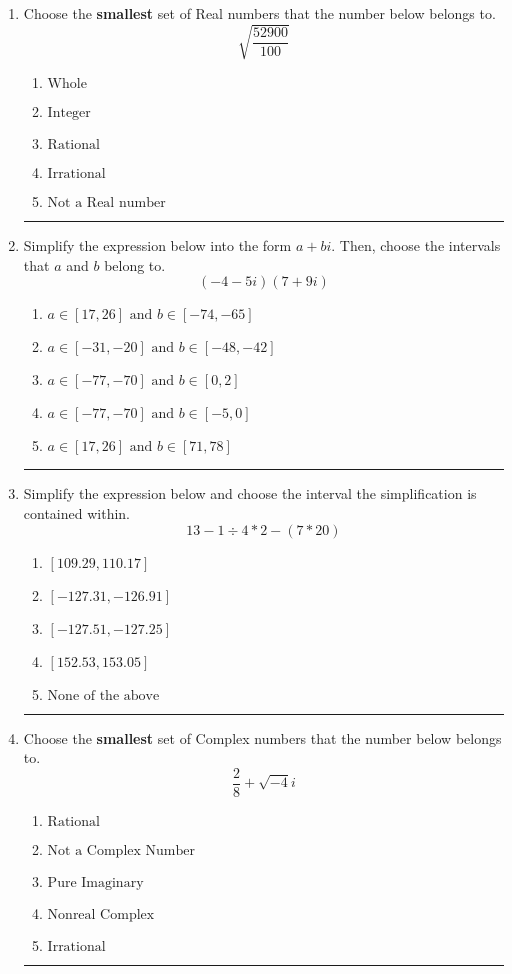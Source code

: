 \documentclass[14pt]{extbook}
\newcommand{\litem}[1]{\item#1\hspace*{-1cm}\rule{\textwidth}{0.4pt}}
\begin{document}
\begin{enumerate}
{\begin{enumerate}[label=\Alph*.]
\end{enumerate} }
\litem{
Choose the \textbf{smallest} set of Real numbers that the number below belongs to.\[ \sqrt{\frac{52900}{100}} \]\begin{enumerate}[label=\Alph*.]
\item \( \text{Whole} \)
\item \( \text{Integer} \)
\item \( \text{Rational} \)
\item \( \text{Irrational} \)
\item \( \text{Not a Real number} \)

\end{enumerate} }
\litem{
Simplify the expression below into the form $a+bi$. Then, choose the intervals that $a$ and $b$ belong to.\[ (-4 - 5 i)(7 + 9 i) \]\begin{enumerate}[label=\Alph*.]
\item \( a \in [17, 26] \text{ and } b \in [-74, -65] \)
\item \( a \in [-31, -20] \text{ and } b \in [-48, -42] \)
\item \( a \in [-77, -70] \text{ and } b \in [0, 2] \)
\item \( a \in [-77, -70] \text{ and } b \in [-5, 0] \)
\item \( a \in [17, 26] \text{ and } b \in [71, 78] \)

\end{enumerate} }
\litem{
Simplify the expression below and choose the interval the simplification is contained within.\[ 13 - 1 \div 4 * 2 - (7 * 20) \]\begin{enumerate}[label=\Alph*.]
\item \( [109.29, 110.17] \)
\item \( [-127.31, -126.91] \)
\item \( [-127.51, -127.25] \)
\item \( [152.53, 153.05] \)
\item \( \text{None of the above} \)

\end{enumerate} }
\litem{
Choose the \textbf{smallest} set of Complex numbers that the number below belongs to.\[ \frac{2}{8}+\sqrt{-4}i \]\begin{enumerate}[label=\Alph*.]
\item \( \text{Rational} \)
\item \( \text{Not a Complex Number} \)
\item \( \text{Pure Imaginary} \)
\item \( \text{Nonreal Complex} \)
\item \( \text{Irrational} \)


\end{enumerate}}
\end{enumerate}
\end{document}
